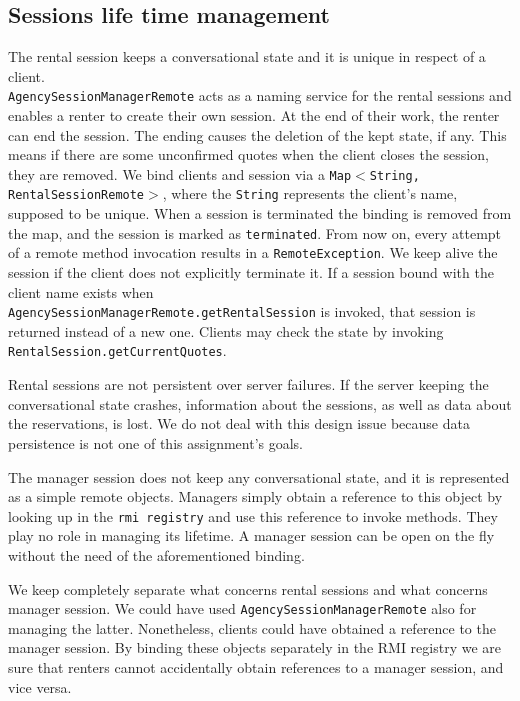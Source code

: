 \subsection{Sessions life time management}
The rental session keeps a conversational state and it is unique in respect of a client. \\\texttt{AgencySessionManagerRemote} acts as a naming service for the rental sessions and enables a renter to create their own session. At the end of their work, the renter can end the session. The ending causes the deletion of the kept state, if any. This means if there are some unconfirmed quotes when the client closes the session, they are removed. We bind clients and session via a \texttt{Map$<$String, RentalSessionRemote$>$}, where the \texttt{String} represents the client's name, supposed to be unique. When a session is terminated the binding is removed from the map, and the session is marked as \texttt{terminated}. From now on, every attempt of a remote method invocation results in a \texttt{RemoteException}. We keep alive the session if the client does not explicitly terminate it. If a session bound with the client name exists when \\\texttt{AgencySessionManagerRemote.getRentalSession} is invoked, that session is returned instead of a new one. Clients may check the state by invoking \texttt{RentalSession.getCurrentQuotes}.

Rental sessions are not persistent over server failures. If the server keeping the conversational state crashes, information about the sessions, as well as data about the reservations, is lost. We do not deal with this design issue because data persistence is not one of this assignment's goals. 

The manager session does not keep any conversational state, and it is represented as a simple remote objects. Managers simply obtain a reference to this object by looking up in the \texttt{rmi registry} and use this reference to invoke methods. They play no role in managing its lifetime. A manager session can be open on the fly without the need of the aforementioned binding.

We keep completely separate what concerns rental sessions and what concerns manager session. We could have used \texttt{AgencySessionManagerRemote} also for managing the latter. Nonetheless, clients could have obtained a reference to the manager session. By binding these objects separately in the RMI registry we are sure that renters cannot accidentally obtain references to a manager session, and vice versa.

